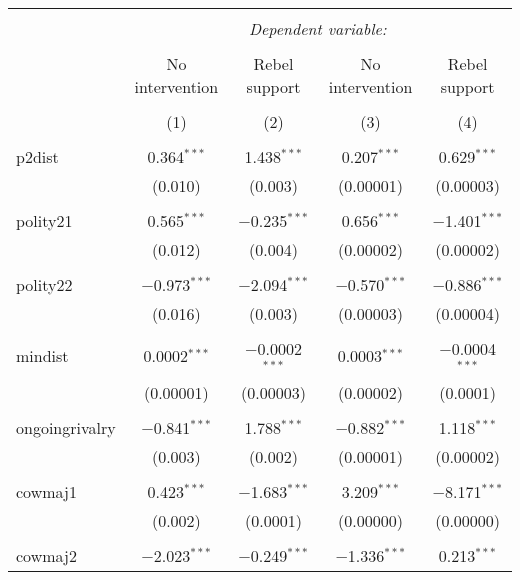 
\begin{table}[!htbp] \centering 
  \caption{} 
  \label{} 
\begin{tabular}{@{\extracolsep{5pt}}lcccc} 
\\[-1.8ex]\hline 
\hline \\[-1.8ex] 
 & \multicolumn{4}{c}{\textit{Dependent variable:}} \\ 
\cline{2-5} 
\\[-1.8ex] & No intervention & Rebel support & No intervention & Rebel support \\ 
\\[-1.8ex] & (1) & (2) & (3) & (4)\\ 
\hline \\[-1.8ex] 
 p2dist & 0.364$^{***}$ & 1.438$^{***}$ & 0.207$^{***}$ & 0.629$^{***}$ \\ 
  & (0.010) & (0.003) & (0.00001) & (0.00003) \\ 
  & & & & \\ 
 polity21 & 0.565$^{***}$ & $-$0.235$^{***}$ & 0.656$^{***}$ & $-$1.401$^{***}$ \\ 
  & (0.012) & (0.004) & (0.00002) & (0.00002) \\ 
  & & & & \\ 
 polity22 & $-$0.973$^{***}$ & $-$2.094$^{***}$ & $-$0.570$^{***}$ & $-$0.886$^{***}$ \\ 
  & (0.016) & (0.003) & (0.00003) & (0.00004) \\ 
  & & & & \\ 
 mindist & 0.0002$^{***}$ & $-$0.0002$^{***}$ & 0.0003$^{***}$ & $-$0.0004$^{***}$ \\ 
  & (0.00001) & (0.00003) & (0.00002) & (0.0001) \\ 
  & & & & \\ 
 ongoingrivalry & $-$0.841$^{***}$ & 1.788$^{***}$ & $-$0.882$^{***}$ & 1.118$^{***}$ \\ 
  & (0.003) & (0.002) & (0.00001) & (0.00002) \\ 
  & & & & \\ 
 cowmaj1 & 0.423$^{***}$ & $-$1.683$^{***}$ & 3.209$^{***}$ & $-$8.171$^{***}$ \\ 
  & (0.002) & (0.0001) & (0.00000) & (0.00000) \\ 
  & & & & \\ 
 cowmaj2 & $-$2.023$^{***}$ & $-$0.249$^{***}$ & $-$1.336$^{***}$ & 0.213$^{***}$ \\ 

\end{tabular}
\end{table}
